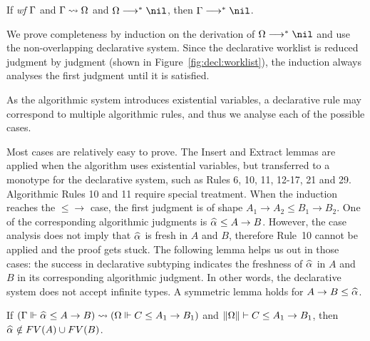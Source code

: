 \begin{theorem}[Completeness]
If \emph{wf }$\Gamma$ and $\Gamma\rightsquigarrow\Omega$ and $\Om\redto\nil$, then $\Gm \redto \nil$.
\label{thm:completeness}
\end{theorem}

We prove completeness by induction on the derivation of $\Om\redto\nil$
and use the non-overlapping declarative system.
Since the declarative worklist is reduced judgment by judgment
(shown in Figure~\ref{fig:decl:worklist}),
the induction always analyses the first judgment until it is satisfied.

As the algorithmic system introduces existential variables,
a declarative rule may correspond to multiple algorithmic rules,
and thus we analyse each of the possible cases.

Most cases are relatively easy to prove.
The Insert and Extract lemmas are applied when the algorithm uses existential variables,
but transferred to a monotype for the declarative system,
such as Rules 6, 10, 11, 12-17, 21 and 29.
Algorithmic Rules 10 and 11 require special treatment.
When the induction reaches the $\mathtt{{\le}{\to}}$ case,
the first judgment is of shape $A_1 \to A_2 \le B_1 \to B_2$.
One of the corresponding algorithmic judgments is $\al \le A \to B$.
However, the case analysis does not imply that $\al$ is fresh in $A$ and $B$,
therefore Rule~10 cannot be applied and the proof gets stuck.
The following lemma helps us out in those cases:
the success in declarative subtyping indicates the freshness of $\al$ in $A$ and $B$
in its corresponding algorithmic judgment.
In other words, the declarative system does not accept infinite types.
A symmetric lemma holds for $A\to B \le \al$.

\begin{lemma}\label{lem:prune_inst}
If $(\Gm \Vdash \al \le A \to B) \sto (\Om \Vdash C \le A_1 \to B_1)$ and
$\|\Omega\| \vdash C \le A_1 \to B_1$, then $\al\notin FV(A) \cup FV(B)$.
\end{lemma}

